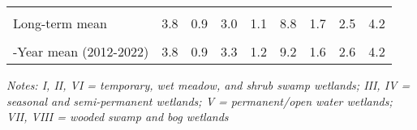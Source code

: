\documentclass[
  12pt,
]{article}
\begin{document}
\begin{table}[!h]
{\begin{threeparttable}
\begin{tabular}[t]{>{\centering\arraybackslash}m{8em}cccccccc}
\cellcolor{gray!6}{\% Change from previous year} & \cellcolor{gray!6}{-89.9\%} & \cellcolor{gray!6}{-81.5\%} & \cellcolor{gray!6}{-68.2\%} & \cellcolor{gray!6}{-96.4\%} & \cellcolor{gray!6}{-80.0\%} & \cellcolor{gray!6}{-92.9\%} & \cellcolor{gray!6}{-95.1\%} & \cellcolor{gray!6}{-94.0\%}\\
Long-term mean & 3.8 & 0.9 & 3.0 & 1.1 & 8.8 & 1.7 & 2.5 & 4.2\\
\cellcolor{gray!6}{\% Change from long-term mean} & \cellcolor{gray!6}{-92.3\%} & \cellcolor{gray!6}{-81.5\%} & \cellcolor{gray!6}{-46.7\%} & \cellcolor{gray!6}{-94.2\%} & \cellcolor{gray!6}{-76.0\%} & \cellcolor{gray!6}{-89.1\%} & \cellcolor{gray!6}{-94.4\%} & \cellcolor{gray!6}{-92.2\%}\\
10-Year mean (2012-2022) & 3.8 & 0.9 & 3.3 & 1.2 & 9.2 & 1.6 & 2.6 & 4.2\\
\bottomrule
\end{tabular}
\begin{tablenotes}
\small
\item \textit{Notes: I, II, VI = temporary, wet meadow, and shrub swamp
    wetlands; III, IV = seasonal and semi-permanent wetlands; V =
    permanent/open water wetlands; VII, VIII = wooded swamp and bog wetlands} 
\item 
\end{tablenotes}
\end{threeparttable}}
\end{table}

\newpage
\end{document}
